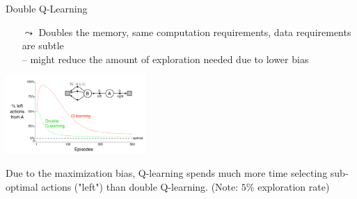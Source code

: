 \documentclass[aspectratio=169]{../latex_main/tntbeamer}  %
\begin{document}
\begin{frame}[c]{Double Q-Learning~}

 \begin{itemize}
     \item[$\leadsto$] Doubles the memory, same computation requirements, data requirements are subtle\\ -- might reduce the amount of exploration needed due to lower bias
 \end{itemize}
 \bigskip
 \pause
\begin{center}
\includegraphics[width=0.4\textwidth]{images/double_q.png}
\end{center}

Due to the maximization bias, Q-learning spends much more time
selecting sub-optimal actions ("left") than double Q-learning. (Note: $5\%$ exploration rate)
	
	
\end{frame}
\end{document}

